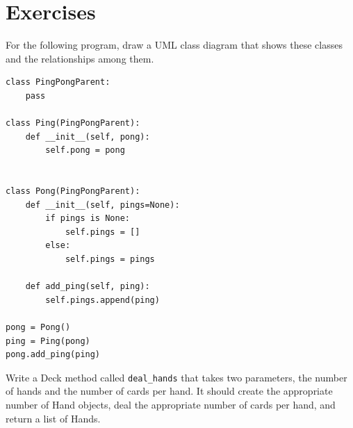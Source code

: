 \documentclass[10pt]{book}
\begin{document}
\section{Exercises}

\begin{exercise}
For the following program, draw a UML class diagram that shows
these classes and the relationships among them.

\begin{verbatim}
class PingPongParent:
    pass

class Ping(PingPongParent):
    def __init__(self, pong):
        self.pong = pong


class Pong(PingPongParent):
    def __init__(self, pings=None):
        if pings is None:
            self.pings = []
        else:
            self.pings = pings

    def add_ping(self, ping):
        self.pings.append(ping)

pong = Pong()
ping = Ping(pong)
pong.add_ping(ping)
\end{verbatim}


\end{exercise}



\begin{exercise}
Write a Deck method called \verb"deal_hands" that
takes two parameters, the number of hands and the number of cards per
hand.  It should create the appropriate number of Hand objects, deal
the appropriate number of cards per hand, and return a list of Hands.
\end{exercise}
\end{document}
